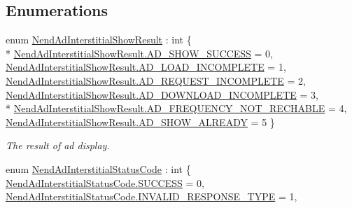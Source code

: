 \subsection*{Enumerations}
\begin{DoxyCompactItemize}
\item 
enum \hyperlink{namespace_nend_unity_plugin_1_1_callback_acda9f80521c8e1306a784491859fa2aa}{Nend\+Ad\+Interstitial\+Show\+Result} \+: int \{ \\*
\hyperlink{namespace_nend_unity_plugin_1_1_callback_acda9f80521c8e1306a784491859fa2aaadee22275784947172867f7d0ebeeafa9}{Nend\+Ad\+Interstitial\+Show\+Result.\+A\+D\+\_\+\+S\+H\+O\+W\+\_\+\+S\+U\+C\+C\+E\+S\+S} = 0, 
\hyperlink{namespace_nend_unity_plugin_1_1_callback_acda9f80521c8e1306a784491859fa2aaa5471223ceb62fe8243f7adbb07e26c76}{Nend\+Ad\+Interstitial\+Show\+Result.\+A\+D\+\_\+\+L\+O\+A\+D\+\_\+\+I\+N\+C\+O\+M\+P\+L\+E\+T\+E} = 1, 
\hyperlink{namespace_nend_unity_plugin_1_1_callback_acda9f80521c8e1306a784491859fa2aaad9c1573d4ff13558b1d18899e1de2b98}{Nend\+Ad\+Interstitial\+Show\+Result.\+A\+D\+\_\+\+R\+E\+Q\+U\+E\+S\+T\+\_\+\+I\+N\+C\+O\+M\+P\+L\+E\+T\+E} = 2, 
\hyperlink{namespace_nend_unity_plugin_1_1_callback_acda9f80521c8e1306a784491859fa2aaa000968292f1fba2b7c2224440861a9ae}{Nend\+Ad\+Interstitial\+Show\+Result.\+A\+D\+\_\+\+D\+O\+W\+N\+L\+O\+A\+D\+\_\+\+I\+N\+C\+O\+M\+P\+L\+E\+T\+E} = 3, 
\\*
\hyperlink{namespace_nend_unity_plugin_1_1_callback_acda9f80521c8e1306a784491859fa2aaabd8be12d9a5eee6104ef3e490c82d2aa}{Nend\+Ad\+Interstitial\+Show\+Result.\+A\+D\+\_\+\+F\+R\+E\+Q\+U\+E\+N\+C\+Y\+\_\+\+N\+O\+T\+\_\+\+R\+E\+C\+H\+A\+B\+L\+E} = 4, 
\hyperlink{namespace_nend_unity_plugin_1_1_callback_acda9f80521c8e1306a784491859fa2aaa2e537892fd898145758945f15128a257}{Nend\+Ad\+Interstitial\+Show\+Result.\+A\+D\+\_\+\+S\+H\+O\+W\+\_\+\+A\+L\+R\+E\+A\+D\+Y} = 5
 \}
\begin{DoxyCompactList}\small\item\em The result of ad display. \end{DoxyCompactList}\item 
enum \hyperlink{namespace_nend_unity_plugin_1_1_callback_a439eb407799e3077fd18b7f3809f68d6}{Nend\+Ad\+Interstitial\+Status\+Code} \+: int \{ \hyperlink{namespace_nend_unity_plugin_1_1_callback_a439eb407799e3077fd18b7f3809f68d6ad0749aaba8b833466dfcbb0428e4f89c}{Nend\+Ad\+Interstitial\+Status\+Code.\+S\+U\+C\+C\+E\+S\+S} = 0, 
\hyperlink{namespace_nend_unity_plugin_1_1_callback_a439eb407799e3077fd18b7f3809f68d6a8f6575bd42a0331283412beeb9ac0895}{Nend\+Ad\+Interstitial\+Status\+Code.\+I\+N\+V\+A\+L\+I\+D\+\_\+\+R\+E\+S\+P\+O\+N\+S\+E\+\_\+\+T\+Y\+P\+E} = 1, 

\end{DoxyCompactItemize}

